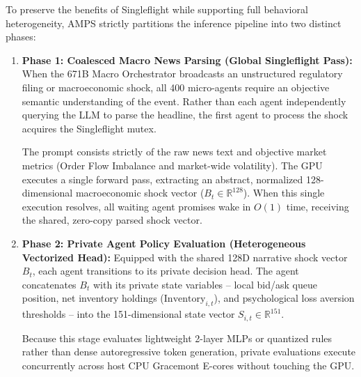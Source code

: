 To preserve the benefits of Singleflight while supporting full behavioral heterogeneity, AMPS strictly partitions the inference pipeline into two distinct phases:

\begin{enumerate}
    \item \textbf{Phase 1: Coalesced Macro News Parsing (Global Singleflight Pass):}
    When the 671B Macro Orchestrator broadcasts an unstructured regulatory filing or macroeconomic shock, all 400 micro-agents require an objective semantic understanding of the event. Rather than each agent independently querying the LLM to parse the headline, the first agent to process the shock acquires the Singleflight mutex. 
    
    The prompt consists strictly of the raw news text and objective market metrics (Order Flow Imbalance and market-wide volatility). The GPU executes a single forward pass, extracting an abstract, normalized 128-dimensional macroeconomic shock vector ($B_t \in \mathbb{R}^{128}$). When this single execution resolves, all waiting agent promises wake in $O(1)$ time, receiving the shared, zero-copy parsed shock vector.
    
    \item \textbf{Phase 2: Private Agent Policy Evaluation (Heterogeneous Vectorized Head):}
    Equipped with the shared 128D narrative shock vector $B_t$, each agent transitions to its private decision head. The agent concatenates $B_t$ with its private state variables -- local bid/ask queue position, net inventory holdings ($\text{Inventory}_{i, t}$), and psychological loss aversion thresholds -- into the 151-dimensional state vector $S_{i, t} \in \mathbb{R}^{151}$. 
    
    Because this stage evaluates lightweight 2-layer MLPs or quantized rules rather than dense autoregressive token generation, private evaluations execute concurrently across host CPU Gracemont E-cores without touching the GPU.
\end{enumerate}

